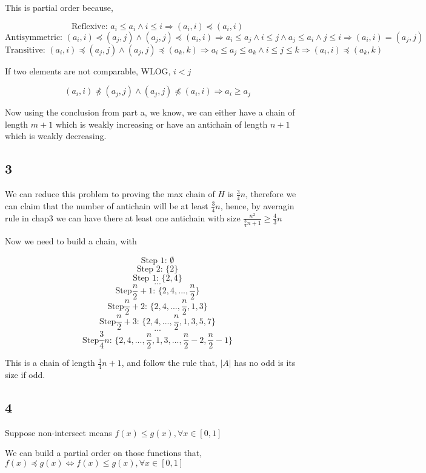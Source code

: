 \documentclass{article}
\def\implies{\Longrightarrow}
\begin{document}
    This is  partial order because, 

    $$\text{Reflexive: } a_i \le a_i \land i \le i \implies (a_i, i) \preceq (a_i, i)$$
    $$\text{Antisymmetric: } (a_i, i) \preceq (a_j, j) \land (a_j, j) \preceq (a_i, i) \implies a_i \le a_j \land i \le j \land  a_j \le a_i \land j \le i \implies (a_i, i) = (a_j, j)$$
    $$\text{Transitive: } (a_i, i) \preceq (a_j, j) \land (a_j, j)  \preceq (a_k, k) \implies a_i \le a_j \le a_k \land i \le j \le k \implies (a_i, i) \preceq (a_k, k) $$

    If two elements are not comparable, WLOG, $i < j$

    $$(a_i, i) \npreceq (a_j, j) \land (a_j, j) \npreceq (a_i, i) \implies a_i \ge a_j$$
    
    Now using the conclusion from part a, we know, we can either have a chain of length $m + 1$ which is weakly increasing or have an antichain of length $n + 1$ which is weakly decreasing. 

\subsection*{3}

We can reduce this problem to proving the max chain of $H$ is $\frac{3}{4}n$, therefore we can claim that the number of antichain will be at least  $\frac{3}{4}n$, hence, by averagin rule in chap3 we can have there at least one antichain with size $\frac{n^2}{\frac{3}{4}n + 1} \ge \frac{4}{3}n$

Now we need to build a chain, with 

$$\text{Step 1: } \emptyset$$
$$\text{Step 2: } \{ 2 \}$$
$$\text{Step 1: } \{2, 4\}$$
$$...$$
$$\text{Step} \frac{n}{2} + 1 \text{: } \{2, 4, ..., \frac{n}{2}\}$$
$$\text{Step} \frac{n}{2} + 2 \text{: } \{2, 4, ..., \frac{n}{2}, 1, 3\}$$
$$\text{Step} \frac{n}{2} + 3 \text{: } \{2, 4, ..., \frac{n}{2}, 1, 3, 5, 7\}$$
$$...$$
$$\text{Step} \frac{3}{4}n \text{: } \{2, 4, ..., \frac{n}{2}, 1, 3, ..., \frac{n}{2} - 2, \frac{n}{2} - 1\}$$

This is a chain of length $\frac{3}{4}n + 1$, and follow the rule that, $|A|$ has no odd is its size if odd. 

\subsection*{4}
    Suppose  non-intersect means $f(x) \le g(x), \forall x \in [0,1]$
    
    We can build a partial order on those functions that, $f(x) \preceq g(x) \iff f(x) \le g(x), \forall x \in [0,1]$
\end{document}
